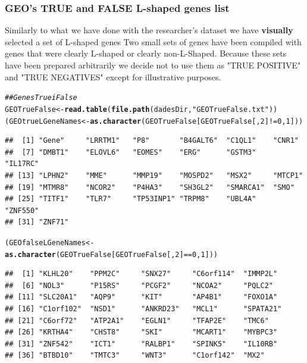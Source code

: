 \documentclass[a4paper,10pt]{article}\usepackage[]{graphicx}\usepackage[]{color}
\makeatletter
\newcommand{\hlnum}[1]{\textcolor[rgb]{0.686,0.059,0.569}{#1}}%
\newcommand{\hlstr}[1]{\textcolor[rgb]{0.192,0.494,0.8}{#1}}%
\newcommand{\hlcom}[1]{\textcolor[rgb]{0.678,0.584,0.686}{\textit{#1}}}%
\newcommand{\hlopt}[1]{\textcolor[rgb]{0,0,0}{#1}}%
\newcommand{\hlstd}[1]{\textcolor[rgb]{0.345,0.345,0.345}{#1}}%
\newcommand{\hlkwb}[1]{\textcolor[rgb]{0.69,0.353,0.396}{#1}}%
\newcommand{\hlkwd}[1]{\textcolor[rgb]{0.737,0.353,0.396}{\textbf{#1}}}%
\newenvironment{kframe}{%
 \def\at@end@of@kframe{}%
 \ifinner\ifhmode%
  \def\at@end@of@kframe{\end{minipage}}%
  \begin{minipage}{\columnwidth}%
 \fi\fi%
 \def\FrameCommand##1{\hskip\@totalleftmargin \hskip-\fboxsep
 \colorbox{shadecolor}{##1}\hskip-\fboxsep
     \hskip-\linewidth \hskip-\@totalleftmargin \hskip\columnwidth}%
 \MakeFramed {\advance\hsize-\width
   \@totalleftmargin\z@ \linewidth\hsize
   \@setminipage}}%
 {\par\unskip\endMakeFramed%
 \at@end@of@kframe}
\newenvironment{knitrout}{}{} %
\makeatother
\begin{document}
\subsubsection{GEO's TRUE and FALSE L-shaped genes list}

Similarly to what we have done with the researcher's dataset we have \textbf{visually} selected a set of L-shaped genes Two small sets of genes have been compiled with genes that were clearly L-shaped or clearly non-L-Shaped. Because these sets have been prepared arbitrarily we decide not to use them as "TRUE POSITIVE" and "TRUE NEGATIVES" except for illustrative purposes.

\begin{knitrout}
\color{fgcolor}\begin{kframe}
\begin{alltt}
\hlcom{## Genes True i False}
\hlstd{GEOTrueFalse} \hlkwb{<-} \hlkwd{read.table}\hlstd{(}\hlkwd{file.path}\hlstd{(dadesDir,} \hlstr{"GEOTrueFalse.txt"}\hlstd{))}
\hlstd{(GEOtrueLGeneNames} \hlkwb{<-} \hlkwd{as.character}\hlstd{(GEOTrueFalse[GEOTrueFalse[,}\hlnum{2}\hlstd{]}\hlopt{!=}\hlnum{0}\hlstd{,}\hlnum{1}\hlstd{]))}
\end{alltt}
\begin{verbatim}
##  [1] "Gene"     "LRRTM1"   "P8"       "B4GALT6"  "C1QL1"    "CNR1"    
##  [7] "DMBT1"    "ELOVL6"   "EOMES"    "ERG"      "GSTM3"    "IL17RC"  
## [13] "LPHN2"    "MME"      "MMP19"    "MOSPD2"   "MSX2"     "MTCP1"   
## [19] "MTMR8"    "NCOR2"    "P4HA3"    "SH3GL2"   "SMARCA1"  "SMO"     
## [25] "TITF1"    "TLR7"     "TP53INP1" "TRPM8"    "UBL4A"    "ZNF550"  
## [31] "ZNF71"
\end{verbatim}
\begin{alltt}
\hlstd{(GEOfalseLGeneNames} \hlkwb{<-} \hlkwd{as.character}\hlstd{(GEOTrueFalse[GEOTrueFalse[,}\hlnum{2}\hlstd{]}\hlopt{==}\hlnum{0}\hlstd{,}\hlnum{1}\hlstd{]))}
\end{alltt}
\begin{verbatim}
##  [1] "KLHL20"    "PPM2C"     "SNX27"     "C6orf114"  "IMMP2L"   
##  [6] "NOL3"      "P15RS"     "PCGF2"     "NCOA2"     "PQLC2"    
## [11] "SLC20A1"   "AQP9"      "KIT"       "AP4B1"     "FOXO1A"   
## [16] "C1orf102"  "NSD1"      "ANKRD23"   "MCL1"      "SPATA21"  
## [21] "C6orf72"   "ATP2A1"    "EGLN1"     "TFAP2E"    "TMC6"     
## [26] "KRTHA4"    "CHST8"     "SKI"       "MCART1"    "MYBPC3"   
## [31] "ZNF542"    "ICT1"      "RALBP1"    "SPINK5"    "IL10RB"   
## [36] "BTBD10"    "TMTC3"     "WNT3"      "C1orf142"  "MX2"      

\end{verbatim}
\end{kframe}
\end{knitrout}
\end{document}
